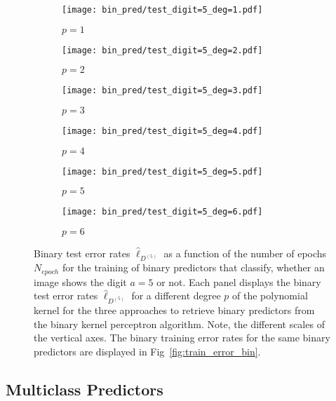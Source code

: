 \begin{figure}[h!]
    \begin{subfigure}[t]{0.49\textwidth}
        \centering
        \texttt{[image: bin\_pred/test\_digit=5\_deg=1.pdf]} 
        \caption{$p = 1$}
    \end{subfigure}
    \hfill
    \begin{subfigure}[t]{0.49\textwidth}
        \centering
        \texttt{[image: bin\_pred/test\_digit=5\_deg=2.pdf]} 
        \caption{$p = 2$}
    \end{subfigure}
    \par\bigskip
        \begin{subfigure}[t]{0.49\textwidth}
        \centering
        \texttt{[image: bin\_pred/test\_digit=5\_deg=3.pdf]} 
        \caption{$p = 3$}
    \end{subfigure}
    \hfill
    \begin{subfigure}[t]{0.49\textwidth}
        \centering
        \texttt{[image: bin\_pred/test\_digit=5\_deg=4.pdf]} 
        \caption{$p = 4$}
    \end{subfigure}
    \par\bigskip
        \begin{subfigure}[t]{0.49\textwidth}
        \centering
        \texttt{[image: bin\_pred/test\_digit=5\_deg=5.pdf]} 
        \caption{$p = 5$}
    \end{subfigure}
    \hfill
    \begin{subfigure}[t]{0.49\textwidth}
        \centering
        \texttt{[image: bin\_pred/test\_digit=5\_deg=6.pdf]} 
        \caption{$p = 6$}
    \end{subfigure}
    \caption{Binary test error rates $\hat{\ell}_{D^{(5)}}$ as a function of the number of epochs $N_{epoch}$ for the training of binary predictors that classify, whether an image shows the digit $a=5$ or not. Each panel displays the binary test error rates $\hat{\ell}_{D^{(5)}}$ for a different degree $p$ of the polynomial kernel for the three approaches to retrieve binary predictors from the binary kernel perceptron algorithm. Note, the different scales of the vertical axes. The binary training error rates for the same binary predictors are displayed in Fig~\ref{fig:train_error_bin}.} \label{fig:test_error_bin}
\end{figure}

\clearpage

\subsection{Multiclass Predictors}\label{subsec:multi_pred}

